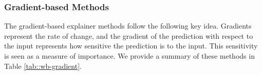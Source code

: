 
\subsubsection{Gradient-based Methods}
\label{sec:sourav_:gradient-based}
The gradient-based explainer methods follow the following key idea. Gradients represent the rate of change, and the gradient of the prediction with respect to the input represents how sensitive the prediction is to the input. This sensitivity is seen as a measure of importance. We provide a summary of these methods in Table \ref{tab::wb-gradient}.

